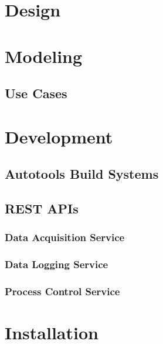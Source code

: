 \documentclass[11pt]{article}
\begin{document}
  \section{Design}\label{sec:dsg}

  \section{Modeling}\label{sec:mod}

    \subsection{Use Cases}\label{sec:mod-use}


  \section{Development}\label{sec:dev}

    \subsection{Autotools Build Systems}\label{sec:dev-ac}

    \subsection{REST APIs}\label{sec:rest}

      \subsubsection{Data Acquisition Service}\label{sec:rest-daq}

      \subsubsection{Data Logging Service}\label{sec:rest-log}

      \subsubsection{Process Control Service}\label{sec:rest-control}

  \section{Installation}\label{sec:inst}
\end{document}
